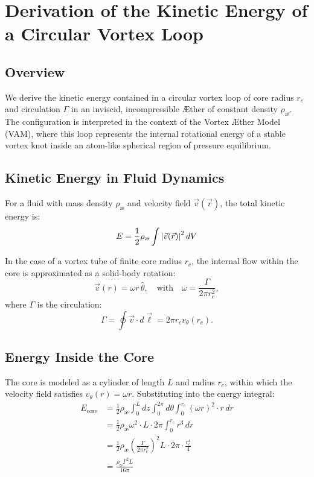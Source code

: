 
\section{Derivation of the Kinetic Energy of a Circular Vortex Loop}\label{sec:derivation-of-the-kinetic-energy-of-a-circular-vortex-loop}

\subsection{Overview}
We derive the kinetic energy contained in a circular vortex loop of core radius $r_c$ and circulation $\Gamma$ in an inviscid, incompressible Æther of constant density $\rho_\text{\ae}$. The configuration is interpreted in the context of the Vortex Æther Model (VAM), where this loop represents the internal rotational energy of a stable vortex knot inside an atom-like spherical region of pressure equilibrium.

\subsection{Kinetic Energy in Fluid Dynamics}
For a fluid with mass density $\rho_\text{\ae}$ and velocity field $\vec{v}(\vec{r})$, the total kinetic energy is:
\begin{equation}
    E = \frac{1}{2} \rho_\text{\ae} \int \abs{\vec{v}(\vec{r})}^2 \, dV
\end{equation}

In the case of a vortex tube of finite core radius $r_c$, the internal flow within the core is approximated as a solid-body rotation:
\begin{equation}
    \vec{v}(r) = \omega r \, \hat{\theta}, \quad \text{with} \quad \omega = \frac{\Gamma}{2\pi r_c^2},
\end{equation}
where $\Gamma$ is the circulation:
\begin{equation}
    \Gamma = \oint \vec{v} \cdot d\vec{\ell} = 2\pi r_c v_\theta(r_c).
\end{equation}

\subsection{Energy Inside the Core}
The core is modeled as a cylinder of length $L$ and radius $r_c$, within which the velocity field satisfies $v_\theta(r) = \omega r$. Substituting into the energy integral:
\begin{align}
    E_\text{core} &= \frac{1}{2} \rho_\text{\ae} \int_0^L dz \int_0^{2\pi} d\theta \int_0^{r_c} (\omega r)^2 \cdot r \, dr \\
    &= \frac{1}{2} \rho_\text{\ae} \omega^2 \cdot L \cdot 2\pi \int_0^{r_c} r^3 \, dr \\
    &= \frac{1}{2} \rho_\text{\ae} \left(\frac{\Gamma}{2\pi r_c^2}\right)^2 L \cdot 2\pi \cdot \frac{r_c^4}{4} \\
    &= \frac{\rho_\text{\ae} \Gamma^2 L}{16\pi}
\end{align}

